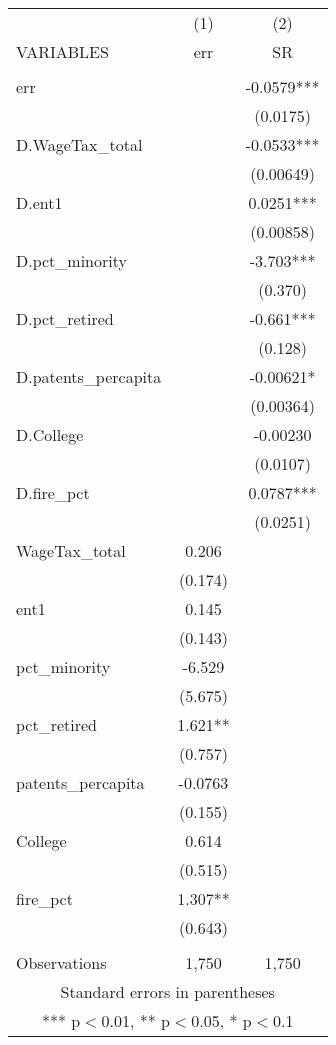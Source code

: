 \begin{tabular}{lcc} \hline
 & (1) & (2) \\
VARIABLES & err & SR \\ \hline
 &  &  \\
err &  & -0.0579*** \\
 &  & (0.0175) \\
D.WageTax\_total &  & -0.0533*** \\
 &  & (0.00649) \\
D.ent1 &  & 0.0251*** \\
 &  & (0.00858) \\
D.pct\_minority &  & -3.703*** \\
 &  & (0.370) \\
D.pct\_retired &  & -0.661*** \\
 &  & (0.128) \\
D.patents\_percapita &  & -0.00621* \\
 &  & (0.00364) \\
D.College &  & -0.00230 \\
 &  & (0.0107) \\
D.fire\_pct &  & 0.0787*** \\
 &  & (0.0251) \\
WageTax\_total & 0.206 &  \\
 & (0.174) &  \\
ent1 & 0.145 &  \\
 & (0.143) &  \\
pct\_minority & -6.529 &  \\
 & (5.675) &  \\
pct\_retired & 1.621** &  \\
 & (0.757) &  \\
patents\_percapita & -0.0763 &  \\
 & (0.155) &  \\
College & 0.614 &  \\
 & (0.515) &  \\
fire\_pct & 1.307** &  \\
 & (0.643) &  \\
 &  &  \\
 Observations & 1,750 & 1,750 \\ \hline
\multicolumn{3}{c}{ Standard errors in parentheses} \\
\multicolumn{3}{c}{ *** p$<$0.01, ** p$<$0.05, * p$<$0.1} \\
\end{tabular}
